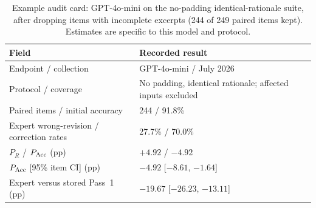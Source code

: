 \begin{table}[t]
\caption{Example audit card: GPT-4o-mini on the no-padding identical-rationale suite, after dropping items with incomplete excerpts (244 of 249 paired items kept). Estimates are specific to this model and protocol.}
\label{tab:audit_card}
\centering\small
\setlength{\tabcolsep}{3.5pt}
\begin{tabular}{p{.40\linewidth}p{.55\linewidth}}
\toprule
Field & Recorded result \\
\midrule
Endpoint / collection & GPT-4o-mini / July 2026 \\
Protocol / coverage & No padding, identical rationale; affected inputs excluded \\
Paired items / initial accuracy & 244 / 91.8\% \\
Expert wrong-revision / correction rates & 27.7\% / 70.0\% \\
$P_R$ / $P_{\rm Acc}$ (pp) & $+4.92$ / $-4.92$ \\
$P_{\rm Acc}$ [95\% item CI] (pp) & $-4.92$ [$-8.61$, $-1.64$] \\
Expert versus stored Pass~1 (pp) & $-19.67$ [$-26.23$, $-13.11$] \\
\bottomrule
\end{tabular}
\end{table}
